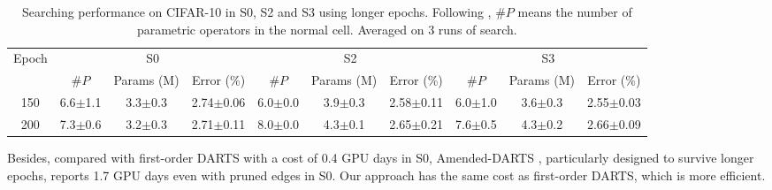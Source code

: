 \documentclass{article} \usepackage{iclr2021_conference,times}
\begin{document}
\begin{table}[ht]
	\setlength{\tabcolsep}{1pt}
	\caption{Searching performance on CIFAR-10 in S0, S2 and S3 using longer epochs. Following \cite{bi2019stabilizing}, $\#P$ means the number of parametric operators in the normal cell. Averaged on 3 runs of search.}
	\smallskip
	\centering
	\smallskip\begin{tabular}{c|*{3}{c}|*{3}{c}|*{3}{c}}
		\toprule
		Epoch  &  \multicolumn{3}{c|}{S0} & \multicolumn{3}{c|}{S2} & \multicolumn{3}{c}{S3} \\
		 &$\#P$  & \small{Params (M)} & \small{Error (\%)} &$\#P$  & \small{Params (M)} & \small{Error (\%)} &  $\#P$  & \small{Params (M)} & \small{Error (\%)} \\
		\midrule
		150 & 6.6$\pm$1.1 & 3.3$\pm$0.3& 2.74$\pm$0.06 & 6.0$\pm$0.0 & 3.9$\pm$0.3 & 2.58$\pm$0.11 & 6.0$\pm$1.0 & 3.6$\pm$0.3 & 2.55$\pm$0.03 \\
		200 & 7.3$\pm$0.6 & 3.2$\pm$0.3 & 2.71$\pm$0.11 &  8.0$\pm$0.0 & 4.3$\pm$0.1 & 2.65$\pm$0.21 & 7.6$\pm$0.5 & 4.3$\pm$0.2 & 2.66$\pm$0.09 \\
		\bottomrule
	\end{tabular}
	\label{tab:long_epoch_search}
\end{table}

Besides, compared with first-order DARTS with a cost of 0.4 GPU days in S0, Amended-DARTS \citep{bi2019stabilizing}, particularly designed to survive longer epochs, reports 1.7 GPU days even with pruned edges in S0. Our approach has the same cost as first-order DARTS, which is more efficient.
\end{document}
